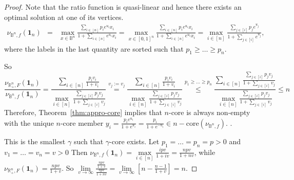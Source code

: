 \documentclass[10pt,a4paper]{amsart}
\begin{document}
\begin{proof}
Note that the ratio function is quasi-linear and hence there exists an optimal solution at one of its vertices.
\begin{eqnarray*}
\nu_{\mathbb{B}^n, f}\left(\mathbf{1}_n\right)&=&\max_{x\in\mathbb{B}^n}\frac{\sum\limits_{i\in [n]}p_ie^{u_i}x_i}{1+\sum\limits_{i\in [n]}e^{u_i}x_i}=\max_{x\in [0,1]^n}\frac{\sum\limits_{i\in [n]}p_ie^{u_i}x_i}{1+\sum\limits_{i\in [n]}e^{u_i}x_i}=\max_{i\in [n]}\frac{\sum\limits_{j\in [i]}p_je^{u_j}}{1+\sum\limits_{j\in [i]}e^{u_j}},
\end{eqnarray*}
where the labels in the last quantity are sorted such that $p_1\ge\dots\ge p_n$.

So
\[
\frac{\nu_{\mathbb{R}^n_{+}, F}\left(\mathbf{1}_n\right)}{\nu_{\mathbb{B}^n, f}\left(\mathbf{1}_n\right)}=\frac{\sum\limits_{i\in [n]}\frac{p_iv_i}{1+v_i}}{\max\limits_{i\in [n]}\frac{\sum\limits_{j\in [i]}p_jv_j}{1+\sum\limits_{j\in [i]}v_j}}\overset{v_j:=v_j}{=}\frac{\sum\limits_{i\in [n]}\frac{p_iv_i}{1+v_i}}{\max\limits_{i\in [n]}\frac{\sum\limits_{j\in [i]}p_jv_j}{1+\sum\limits_{j\in [i]}v_j}}\overset{p_1\ge\dots\ge p_n}{\le} 
\frac{\sum\limits_{i\in [n]}\frac{\sum\limits_{j\in [i]}p_jv_j}{1+\sum\limits_{j\in [i]}v_j}}{\max\limits_{i\in [n]}\frac{\sum\limits_{j\in [i]}p_jv_j}{1+\sum\limits_{j\in [i]}v_j}}
\le n
\]
Therefore, Theorem~\ref{thm:appro-core} implies that $n$-core is always non-empty with the unique $n$-core member $y_i=\frac{p_ie^{u_i}}{1+e^{u_i}}=\frac{p_i}{1+e^{-u_i}}\in n-\text{core}(\nu_{\mathbb{B}^n, f})$. . 


This is the smallest $\gamma$ such that $\gamma$-core exists. Let $p_1=\dots=p_n=p>0$ and $v_1=\dots=v_n=v>0$ Then $\nu_{\mathbb{B}^n, f}\left(\mathbf{1}_n\right)=\max\limits_{i\in [n]}\frac{ipv}{1+iv}=\frac{npv}{1+nv}$, while $\nu_{\mathbb{R}^n_{+}, F}\left(\mathbf{1}_n\right)=\frac{npv}{1+v}$. So $\lim\limits_{v\to\infty} \frac{\frac{npv}{1+v}}{\frac{npv}{1+nv}}=\lim\limits_{v\to\infty} \left[n-\frac{n-1}{1+v}\right]=n$. 
\end{proof}
\end{document}
